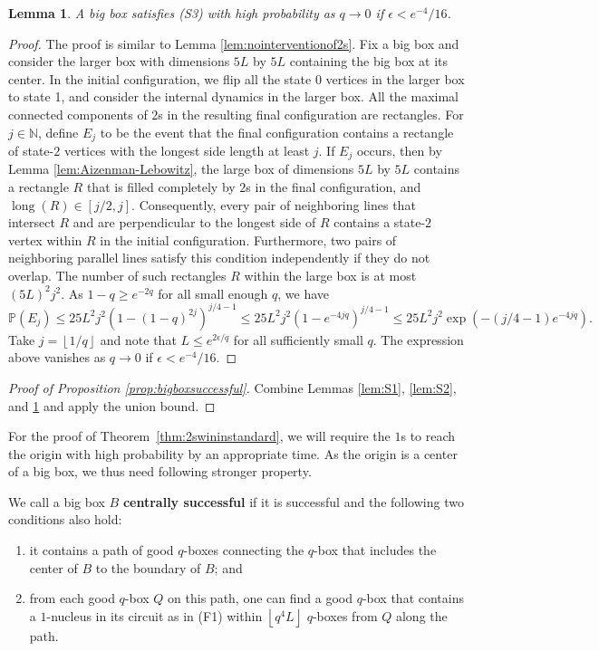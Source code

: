 \documentclass{article}
\renewcommand{\P}{\mathbb{P}}
\newcommand{\floor}[1]{\left\lfloor#1\right \rfloor}
\newcommand{\N}{\mathbb{N}}
\newcommand{\df}[1]{\textbf{#1}}
\numberwithin{equation}{section}
\newtheorem{lemma}[theorem]{Lemma}
\newcommand{\note}[1]{{\bf \textcolor{blue}
{[#1\marginpar{\textcolor{red}{***}}]}}}
\begin{document}
\begin{lemma}\label{lem:S3}
    A big box satisfies (S3) with high probability as $q \to 0$ if $\epsilon < e^{-4}/16$.
\end{lemma}
\begin{proof}
    The proof is similar to Lemma \ref{lem:nointerventionof2s}.
    Fix a big box and consider the larger box with dimensions $5L$ by $5L$ containing the big box at its center.
    In the initial configuration, we flip all the state 0 vertices in the larger box to state 1, and consider the internal dynamics in the larger box.
    All the maximal connected components of $2$s in the resulting final configuration are rectangles. 
    For $j \in \N$, define $E_j$ to be the event that the final configuration contains a rectangle of state-$2$ vertices with the longest side length at least $j$.
    If $E_j$ occurs, then by Lemma \ref{lem:Aizenman-Lebowitz}, the large box of dimensions $5L$ by $5L$ contains a rectangle $R$ that is filled completely by $2$s in the final configuration, and $\operatorname{long}(R) \in [j/2, j]$.
    Consequently, every pair of neighboring lines that intersect $R$ and are perpendicular to the longest side of $R$ contains a state-$2$ vertex within $R$ in the initial configuration.
    Furthermore, two pairs of neighboring parallel lines satisfy this condition independently if they do not overlap.
    The number of such rectangles $R$ within the large box is at most $(5L)^2 j^2$.
    As $1 - q \geq e^{-2q}$ for all small enough $q$, we have 
    \[
    \P(E_j) \leq 25 L^2 j^2 (1 - (1 - q)^{2j})^{j/4 - 1} 
    \leq
    25 L^2 j^2(1 - e^{-4jq})^{j/4 - 1}
    \leq
    25 L^2 j^2\exp(-(j/4 - 1)e^{-4jq})
    .
    \]
    Take $j = \floor{1/q}$ and note that $L \leq e^{2\epsilon/q}$ for all sufficiently small $q$.
    The expression above vanishes as $q \to 0$ if $\epsilon < e^{-4}/16$.
\end{proof}
\begin{proof}[Proof of Proposition \ref{prop:bigboxsuccessful}]
    Combine Lemmas \ref{lem:S1}, \ref{lem:S2}, and \ref{lem:S3} and apply the union bound.
\end{proof}


For the proof of Theorem~\ref{thm:2swininstandard}, we will require the
$1$s to reach the origin with high probability by an appropriate time. 
As the 
origin is a center of a big box, we thus need following stronger property.

We call a big box $B$ \df{centrally successful} if it is successful and 
the following two conditions also hold:
\begin{enumerate}[leftmargin=1cm]
    \item[(CS1)] 
    it contains a path of good $q$-boxes connecting the $q$-box that includes the center of $B$ to the boundary of $B$; and
    
    \item[(CS2)] 
   from each good $q$-box $Q$ on this path, one can find a good $q$-box that contains a $1$-nucleus in its circuit as in (F1) within $\floor{q^4 L}$ $q$-boxes from $Q$ along the path.
\end{enumerate}
\end{document}
